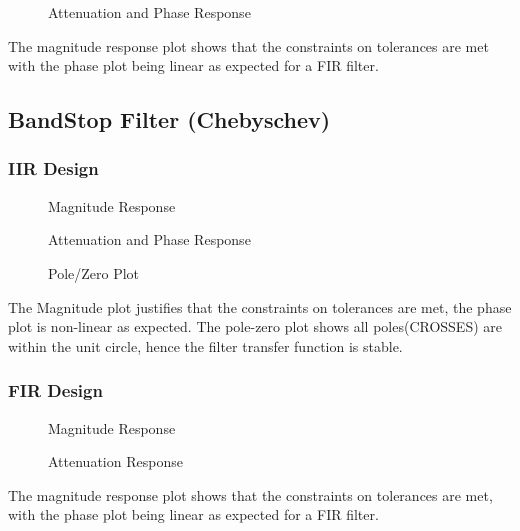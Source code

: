 \documentclass[12pt]{article}
\begin{document}
\begin{figure}[H]
    \caption{Attenuation and Phase Response}
\end{figure}

The magnitude response plot shows that the constraints on tolerances are met with the phase plot being linear as expected for a FIR filter.

\newpage
\subsection{BandStop Filter (Chebyschev)}
\subsubsection{IIR Design}

\begin{figure}[H]
    \caption{Magnitude Response}
\end{figure}

\begin{figure}[H]
    \caption{Attenuation and Phase Response}
\end{figure}

\begin{figure}[H]
    \caption{Pole/Zero Plot}
\end{figure}


The Magnitude plot justifies that the constraints on tolerances are met, the phase plot is non-linear as expected. The pole-zero plot shows all poles(CROSSES) are within the unit circle, hence the filter transfer function is stable.
\subsubsection{FIR Design}

\begin{figure}[H]
    \caption{Magnitude Response}
\end{figure}

\begin{figure}[H]
    \caption{Attenuation Response}
\end{figure}


The magnitude response plot shows that the constraints on tolerances are met, with the phase plot being linear as expected for a FIR filter.
\end{document}
